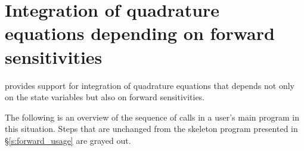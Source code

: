 \section{Integration of quadrature equations depending on forward sensitivities}

{\idas} provides support for integration of quadrature equations that depends not only 
on the state variables but also on forward sensitivities.


The following is an overview of the sequence of calls in a user's main program in 
this situation. Steps that are unchanged from the skeleton program presented in 
\S\ref{s:forward_usage} are grayed out.

